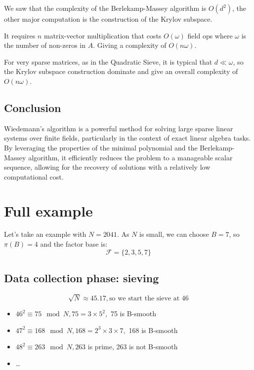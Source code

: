 \documentclass[a4paper, 11pt]{article}
\begin{document}
We saw that the complexity of the Berlekamp-Massey algorithm is $O(d^2)$, the other major computation is the construction of the Krylov subspace.

It requires $n$ matrix-vector multiplication that costs $O(\omega)$ field ops where $\omega$ is the number of non-zeros in $A$. Giving a complexity of $O(n\omega)$.

For very sparse matrices, as in the Quadratic Sieve, it is typical that $d \ll \omega$, so the Krylov subspace construction dominate and give an overall complexity of $O(n\omega)$.

\subsection{Conclusion}
Wiedemann's algorithm is a powerful method for solving large sparse linear systems over finite fields, particularly in the context of exact linear algebra tasks. By leveraging the properties of the minimal polynomial and the Berlekamp-Massey algorithm, it efficiently reduces the problem to a manageable scalar sequence, allowing for the recovery of solutions with a relatively low computational cost.

\pagebreak

\section{Full example}
Let's take an example with $N = 2041$.
As $N$ is small, we can choose $B = 7$, so $\pi(B) = 4$ and the factor base is:
\begin{equation}
    \mathcal{F} = \{2, 3, 5, 7\}
\end{equation}


\subsection{Data collection phase: sieving}
\begin{equation}
    \sqrt{N} \approx 45.17, \text{so we start the sieve at 46}
\end{equation}

\begin{itemize}
    \item $46^2 \equiv 75 \mod{N}, 75 = 3 \times 5^2,$ 75 is B-smooth
    \item $47^2 \equiv 168 \mod{N}, 168 = 2^3 \times 3 \times 7,$ 168 is B-smooth
    \item $48^2 \equiv 263 \mod{N}, 263$ is prime, 263 is not B-smooth
    \item \dots
\end{itemize}
\end{document}
